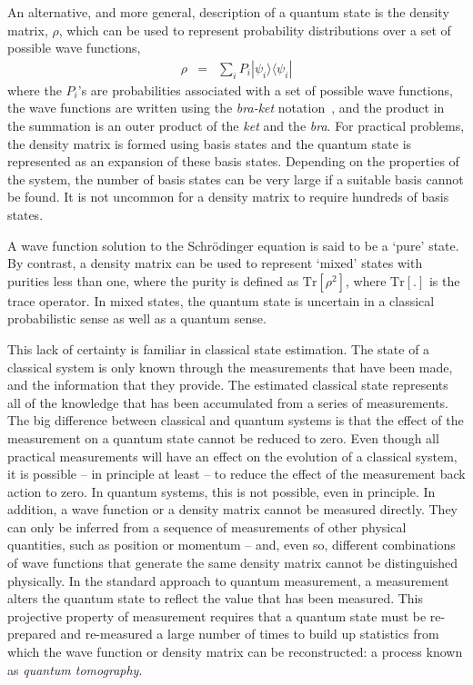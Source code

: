 \documentclass[conference]{IEEEtran}
\begin{document}
An alternative, and more general, description of a quantum state is the density matrix, $\rho$, which can be used to represent probability distributions over a set of possible wave functions, 
\begin{eqnarray}\label{densityOp}
\rho&=&\sum_{i} P_i |\psi_i\rangle\langle \psi_i|
\end{eqnarray}
where the $P_i$'s are probabilities associated with a set of possible wave functions, the wave functions are written using the {\it bra-ket} notation~\cite{Wis2010,Jac2014}, and the product in the summation is an outer product of the {\it ket} and the {\it bra}. For practical problems, the density matrix is formed using basis states and the quantum state is represented as an expansion of these basis states. Depending on the properties of the system, the number of basis states can be very large if a suitable basis cannot be found. It is not uncommon for a density matrix to require hundreds of basis states. 

A wave function solution to the Schr\"{o}dinger equation is said to be a `pure' state. By contrast, a density matrix can be used to represent `mixed' states with purities less than one, where the purity is defined as $\mathrm{Tr}[\rho^2] $, where $\mathrm{Tr}[.]$ is the trace operator. In mixed states, the quantum state is uncertain in a classical probabilistic sense as well as a quantum sense. 

This lack of certainty is familiar in classical state estimation. The state of a classical system is only known through the measurements that have been made, and the information that they provide. The estimated classical state represents all of the knowledge that has been accumulated from a series of measurements. The big difference between classical and quantum systems is that the effect of the measurement on a quantum state cannot be reduced to zero. Even though all practical measurements will have an effect on the evolution of a classical system, it is possible -- in principle at least -- to reduce the effect of the measurement back action to zero. In quantum systems, this is not possible, even in principle. In addition, a wave function or a density matrix cannot be measured directly. They can only be inferred from a sequence of measurements of other physical quantities, such as position or momentum -- and, even so, different combinations of wave functions that generate the same density matrix cannot be distinguished physically. In the standard approach to quantum measurement, a measurement alters the quantum state to reflect the value that has been measured. This projective property of measurement requires that a quantum state must be re-prepared and re-measured a large number of times to build up statistics from which the wave function or density matrix can be reconstructed: a process known as {\it quantum tomography}.
\end{document}

